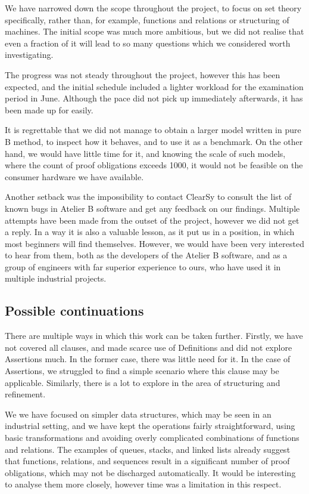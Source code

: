 \documentclass[12pt,journal,duplex]{IEEEtran}
\begin{document}
	We have narrowed down the scope throughout the project, to focus on set theory specifically, rather than, for example, functions and relations or structuring of machines. The initial scope was much more ambitious, but we did not realise that even a fraction of it will lead to so many questions which we considered worth investigating.

	The progress was not steady throughout the project, however this has been expected, and the initial schedule included a lighter workload for the examination period in June. Although the pace did not pick up immediately afterwards, it has been made up for easily.

	It is regrettable that we did not manage to obtain a larger model written in pure B method, to inspect how it behaves, and to use it as a benchmark. On the other hand, we would have little time for it, and knowing the scale of such models, where the count of proof obligations exceeds 1000, it would not be feasible on the consumer hardware we have available.

	Another setback was the impossibility to contact ClearSy to consult the list of known bugs in Atelier B software and get any feedback on our findings. Multiple attempts have been made from the outset of the project, however we did not get a reply. In a way it is also a valuable lesson, as it put us in a position, in which most beginners will find themselves. However, we would have been very interested to hear from them, both as the developers of the Atelier B software, and as a group of engineers with far superior experience to ours, who have used it in multiple industrial projects.

	\subsection{Possible continuations}
	There are multiple ways in which this work can be taken further. Firstly, we have not covered all clauses, and made scarce use of Definitions and did not explore Assertions much. In the former case, there was little need for it. In the case of Assertions, we struggled to find a simple scenario where this clause may be applicable. Similarly, there is a lot to explore in the area of structuring and refinement.

	We we have focused on simpler data structures, which may be seen in an industrial setting, and we have kept the operations fairly straightforward, using basic transformations and avoiding overly complicated combinations of functions and relations. The examples of queues, stacks, and linked lists already suggest that functions, relations, and sequences result in a significant number of proof obligations, which may not be discharged automatically. It would be interesting to analyse them more closely, however time was a limitation in this respect.
\end{document}
